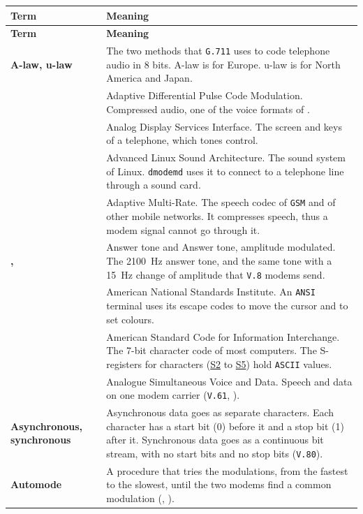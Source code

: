 \documentclass[a5paper,10pt]{article}
\makeatletter
\newcommand{\thd}[1]{\normalfont\textbf{\color{dmnavy}#1}}
\newcommand{\cmd}[1]{\texttt{#1}}
\newcommand{\std}[1]{\texttt{#1}}
\newcommand{\stdb}[1]{\textpdfrender{TextRenderingMode=FillStroke,
  LineWidth=0.25pt}{\texttt{#1}}}
\newcommand{\cmdl}[2][]{\hyperlink{cmd:#1}{\cmd{#2}}}
\newcommand{\sreg}[1]{\hyperlink{sreg:#1}{S#1}}
\let\cmd\@firstofone
\makeatother
\begin{document}
{\setlength{\LTleft}{0pt}\small
\begin{longtable}{|>{\raggedright\arraybackslash}p{}|>{\raggedright\arraybackslash}p{}|}
\hline\rowcolor{dmhead}\thd{Term} & \thd{Meaning} \\ \hline
\endfirsthead
\hline\rowcolor{dmhead}\thd{Term} & \thd{Meaning} \\ \hline
\endhead
\textbf{A-law, u-law} & The two methods that \std{G.711} uses to code telephone audio in 8 bits.  A-law is for Europe.  u-law is for North America and Japan. \\ \hline
\textbf{\stdb{ADPCM}} & Adaptive Differential Pulse Code Modulation.  Compressed audio, one of the voice formats of \cmdl[plusVSM]{+VSM}. \\ \hline
\textbf{\stdb{ADSI}} & Analog Display Services Interface.  The screen and keys of a telephone, which tones control. \\ \hline
\textbf{\stdb{ALSA}} & Advanced Linux Sound Architecture.  The sound system of Linux.  \texttt{dmodemd} uses it to connect to a telephone line through a sound card. \\ \hline
\textbf{\stdb{AMR}} & Adaptive Multi-Rate.  The speech codec of \std{GSM} and of other mobile networks.  It compresses speech, thus a modem signal cannot go through it. \\ \hline
\textbf{\stdb{ANS}, \stdb{ANSam}} & Answer tone and Answer tone, amplitude modulated.  The 2100~Hz answer tone, and the same tone with a 15~Hz change of amplitude that \std{V.8} modems send. \\ \hline
\textbf{\stdb{ANSI}} & American National Standards Institute.  An \std{ANSI} terminal uses its escape codes to move the cursor and to set colours. \\ \hline
\textbf{\stdb{ASCII}} & American Standard Code for Information Interchange.  The 7-bit character code of most computers.  The S-registers for characters (\sreg{2} to \sreg{5}) hold \std{ASCII} values. \\ \hline
\textbf{\stdb{ASVD}} & Analogue Simultaneous Voice and Data.  Speech and data on one modem carrier (\std{V.61}, \cmdl[plusASVD]{+ASVD}). \\ \hline
\textbf{Asynchronous, synchronous} & Asynchronous data goes as separate characters.  Each character has a start bit (0) before it and a stop bit (1) after it.  Synchronous data goes as a continuous bit stream, with no start bits and no stop bits (\std{V.80}). \\ \hline
\textbf{Automode} & A procedure that tries the modulations, from the fastest to the slowest, until the two modems find a common modulation (\cmdl[N]{N}, \cmdl[plusMS]{+MS}). \\ \hline

\end{longtable}}
\end{document}
